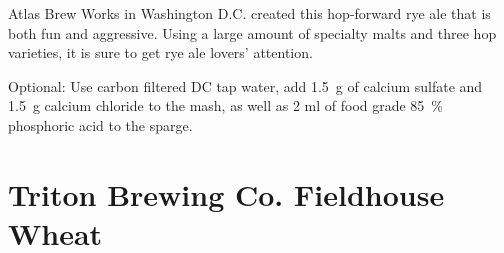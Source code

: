 \documentclass[10pt,oneside]{scrbook}
\begin{document}
\begin{aboutblock}
Atlas Brew Works in Washington D.C. created this hop-forward rye ale that is both
fun and aggressive. Using a large amount of specialty malts and three hop varieties,
it is sure to get rye ale lovers' attention.
\end{aboutblock}


\begin{methodandtiming}
 
\begin{mashsteps}
\end{mashsteps}

\begin{directions}
Optional: Use carbon filtered DC tap water, add 1.5~g of calcium sulfate and
1.5~g calcium chloride to the mash, as well as 2 ml of food grade 85~\%
phosphoric acid to the sparge.
\end{directions}

\end{methodandtiming}

\pagebreak

\begin{ingredientsblock}

\begin{malts}
\end{malts}

\begin{hops}
\end{hops}

\begin{yeasts}
\end{yeasts}

\end{ingredientsblock}

\chapter*{Triton Brewing Co. Fieldhouse Wheat}
\end{document}
